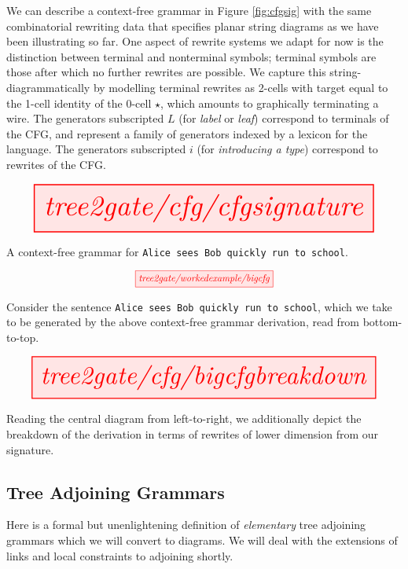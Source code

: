 We can describe a context-free grammar in Figure \ref{fig:cfgsig} with the same combinatorial rewriting data that specifies planar string diagrams as we have been illustrating so far. One aspect of rewrite systems we adapt for now is the distinction between terminal and nonterminal symbols; terminal symbols are those after which no further rewrites are possible. We capture this string-diagrammatically by modelling terminal rewrites as 2-cells with target equal to the 1-cell identity of the 0-cell $\star$, which amounts to graphically terminating a wire. The generators subscripted $L$ (for \emph{label} or \emph{leaf}) correspond to terminals of the CFG, and represent a family of generators indexed by a lexicon for the language. The generators subscripted $i$ (for \emph{introducing a type}) correspond to rewrites of the CFG.

\begin{marginfigure}\label{fig:cfgsig}
\centering
\[\resizebox{\textwidth}{!}{\tikzfig{tree2gate/cfg/cfgsignature}}\]
\caption{A context-free grammar for \texttt{Alice sees Bob quickly run to school}.}
\end{marginfigure}

\begin{marginfigure}\label{fig:bigcfg}
\centering
\[\resizebox{0.4\textwidth}{!}{\tikzfig{tree2gate/workedexample/bigcfg}}\]
\caption{Consider the sentence \texttt{Alice sees Bob quickly run to school}, which we take to be generated by the above context-free grammar derivation, read from bottom-to-top.}
\end{marginfigure}

\begin{marginfigure}\label{fig:cfgbreakdown}
\centering
\[\resizebox{\textwidth}{!}{\tikzfig{tree2gate/cfg/bigcfgbreakdown}}\]
\caption{Reading the central diagram from left-to-right, we additionally depict the breakdown of the derivation in terms of rewrites of lower dimension from our signature.}
\end{marginfigure}

\subsection{Tree Adjoining Grammars}

Here is a formal but unenlightening definition of \emph{elementary} tree adjoining grammars which we will convert to diagrams. We will deal with the extensions of links and local constraints to adjoining shortly.

